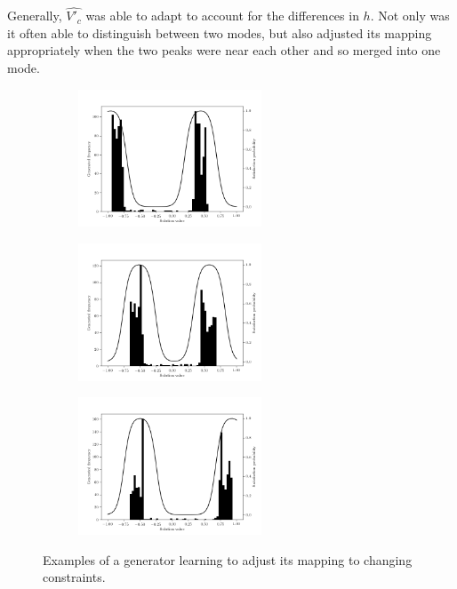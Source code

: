 \documentclass[../../main.tex]{subfiles}
\begin{document}
Generally, $\hat{V'_c}$ was able to adapt to account for the differences in $h$.
Not only was it often able to distinguish between two modes, but also adjusted its mapping appropriately when the two peaks were near each other and so merged into one mode.
\begin{figure}[H]
    \centering
    \begin{subfigure}[a]{1.\textwidth}
        \centering
        \includegraphics[width=0.6\textwidth]{embeddedConstraint1}
    \end{subfigure}
    \begin{subfigure}[a]{1.\textwidth}
        \centering
        \includegraphics[width=0.6\textwidth]{embeddedConstraint2}
    \end{subfigure}
    \begin{subfigure}[a]{1.\textwidth}
        \centering
        \includegraphics[width=0.6\textwidth]{embeddedConstraint5}
    \end{subfigure}
    \caption[Adapting to varying constraint embeddings]{
        Examples of a generator learning to adjust its mapping to changing constraints.
    }
\label{fig:embeddedConstraintsBimodal}
\end{figure}
\end{document}
